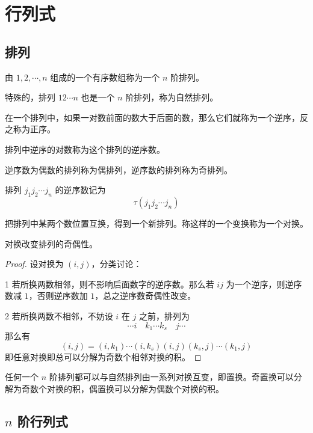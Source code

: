 \chapter{行列式}

\section{排列}

\begin{definition}
	由 $1,2,\cdots,n$ 组成的一个有序数组称为一个 $n$ 阶排列。
\end{definition}

特殊的，排列 $12\cdots n$ 也是一个 $n$ 阶排列，称为自然排列。

\begin{definition}
	在一个排列中，如果一对数前面的数大于后面的数，那么它们就称为一个逆序，反之称为正序。
	
	排列中逆序的对数称为这个排列的逆序数。
\end{definition}

逆序数为偶数的排列称为偶排列，逆序数的排列称为奇排列。

排列 $j_1j_2\cdots j_n$ 的逆序数记为
\[\tau(j_1j_2\cdots j_n)\]

\begin{definition}
	把排列中某两个数位置互换，得到一个新排列。称这样的一个变换称为一个对换。
\end{definition}

\begin{theorem}
	对换改变排列的奇偶性。
\end{theorem}

\begin{proof}
	设对换为 $(i,j)$，分类讨论：

	\num{1} 若所换两数相邻，则不影响后面数字的逆序数。那么若 $ij$ 为一个逆序，则逆序数减 $1$，否则逆序数加 $1$，总之逆序数奇偶性改变。

	\num{2} 若所换两数不相邻，不妨设 $i$ 在 $j$ 之前，排列为
	\[\cdots i \quad k_1 \cdots k_s \quad j\cdots\]
	那么有
	\[(i,j)=(i,k_1)\cdots(i,k_s)(i,j)(k_s,j)\cdots(k_1,j)\]
	即任意对换即总可以分解为奇数个相邻对换的积。
\end{proof}

任何一个 $n$ 阶排列都可以与自然排列由一系列对换互变，即置换。奇置换可以分解为奇数个对换的积，偶置换可以分解为偶数个对换的积。

\section{\texorpdfstring{$n$ 阶行列式}{n 阶行列式}}


